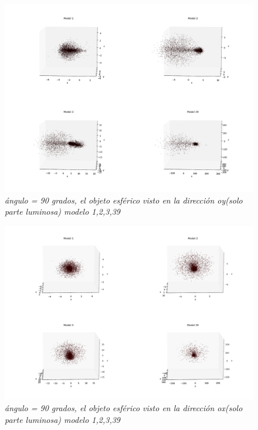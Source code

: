 \documentclass[12pt]{article} %
\renewcommand{\=}[1]{\stackrel{#1}{=}} %
\theoremstyle{definition}
\theoremstyle{remark}
\begin{document}
\begin{figure}[!ht]
 \centering
 \includegraphics[scale=0.2]{sep590deg-2oy.png}
 \caption{\emph{ ángulo = 90 grados, el objeto esférico visto en la dirección oy(solo parte luminosa) modelo 1,2,3,39 }}
\end{figure}

\begin{figure}[!ht]
 \centering
 \includegraphics[scale=0.2]{sep5-90deg-eox.png}
 \caption{\emph{ ángulo = 90 grados, el objeto esférico visto en la dirección ox(solo parte luminosa) modelo 1,2,3,39 }}
\end{figure}
\end{document}
